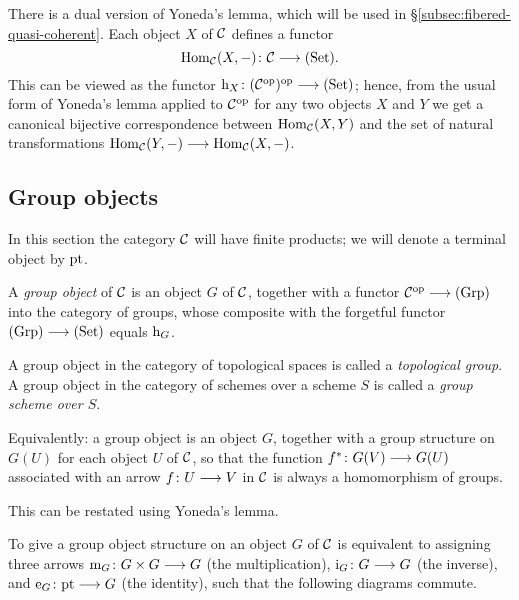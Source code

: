 \begin{2   CONTRAVARIANT FUNCTORS}
\begin{2.1 Yoneda Lemma}
\begin{remark}\label{rmk:dual-Yoneda}
There is a dual version of Yoneda's lemma, which will be used in  \S\ref{subsec:fibered-quasi-coherent}. Each object $X$ of $\mathcal{C}$ defines a functor
   \[
   \hom_{\cC}(X,-) \colon \cC \arr \catset.
   \]
This can be viewed as the functor $\h_X \colon (\cC\op)\op \arr \catset$; hence, from the usual form of Yoneda's lemma applied to $\mathcal{C}^{\mathrm{op}}$ for any two objects $X$ and $Y$ we get a canonical bijective correspondence between $\operatorname{Hom}_{\mathcal{C}}(X,Y)$ and the set of natural transformations $\hom_{\cC}(Y,-) \arr \hom_{\cC}(X,-)$.
\end{remark}


\end{2.1 Yoneda Lemma}
\begin{2.2 Group objects}
\setcounter{section}{1}
\section{Group objects}\label{sec:group-objects}

In this section the category $\mathcal{C}$ will have finite products; we will denote a terminal object by $\mathrm{pt}$.

\begin{definition}
A \emph{group object} of $\mathcal{C}$ is an object $G$ of $\mathcal{C}$, together with a functor $\cC\op \arr \catgrp$ into the category of groups, whose composite with the forgetful functor $\catgrp \arr \catset$ equals $\mathrm{h}_G$.

A group object in the category of topological spaces is called a \emph{topological group}. A group object in the category of schemes over a scheme $S$ is called a \emph{group scheme over $S$}.
\end{definition}

Equivalently: a group object is an object $G$, together with a group structure on $G(U)$ for each object $U$ of $\mathcal{C}$, so that the function $f^* \colon G(V) \arr G(U)$ associated with an arrow $f \colon U \arr V$ in $\mathcal{C}$ is always a homomorphism of groups.

This can be restated using Yoneda's lemma.

\begin{proposition}
To give a group object structure on an object $G$ of $\mathcal{C}$ is equivalent to assigning three arrows $\mul_G \colon G \times G \arr G$ (the multiplication), $\inv_G \colon G \arr G$ (the inverse), and $\iden_G \colon \pt \arr G$ (the identity), such that the following diagrams commute.


\end{proposition}
\end{2.2 Group objects}
\end{2   CONTRAVARIANT FUNCTORS}
